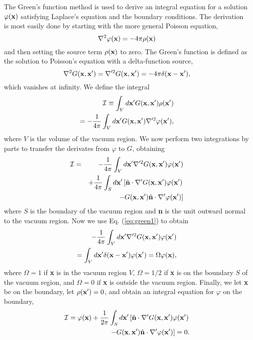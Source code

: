 \documentclass[prb,twocolumn,showpacs,preprintnumbers,amsmath,amssymb]{revtex4}
\renewcommand*{\v}[1]{\hbox{\bfseries #1}}
\begin{document}
The Green's function method is used to derive an integral equation for a
solution $\varphi(\v{x})$ satisfying Laplace's equation and the boundary
conditions.  The derivation is most easily done by starting with the
more general Poisson equation,
\[
\nabla^2 \varphi(\v{x}) = -4 \pi \rho(\v{x})
\]
and then setting the source term $\rho(\v{x})$ to zero.  The Green's
function is defined as the solution to Poisson's equation with a
delta-function source,
\begin{equation}
\nabla^2 G(\v{x},\v{x}') 
	= \nabla'^2 G(\v{x},\v{x}') 
	= -4 \pi \delta(\v{x} - \v{x}'),
\label{eq:green1}
\end{equation}
which vanishes at infinity.  We define the integral
\begin{eqnarray}
{\cal I} \equiv \int_V d\v{x}' G(\v{x},\v{x}') \rho(\v{x}') \nonumber \\
= - \frac{1}{4 \pi} \int_V d\v{x}' G(\v{x},\v{x}') 
	\nabla'^2 \varphi(\v{x}'),
\end{eqnarray}
where $V$ is the volume of the vacuum region.  We now perform
two integrations by parts to transfer the derivates from $\varphi$ to
$G$, obtaining
\begin{eqnarray}
{\cal I} =&& - \frac{1}{4 \pi} \int_V d\v{x}' \nabla'^2 G(\v{x},\v{x}')
	\varphi(\v{x}') \nonumber \\
&&+ \frac{1}{4 \pi} \int_S d\v{x}' \left[ 
	\hat{\bf n} \cdot \nabla' G(\v{x},\v{x}') \varphi(\v{x}')
	\right. \nonumber \\
&&\left. - G(\v{x},\v{x}') \hat{\bf n} \cdot \nabla' \varphi(\v{x}') 
	\right]
\end{eqnarray}
where $S$ is the boundary of the vacuum region and \v{n} is the unit
outward normal to the vacuum region.  Now we use Eq. (\ref{eq:green1})
to obtain
\begin{eqnarray}
- \frac{1}{4 \pi} \int_V d\v{x}' \nabla'^2 G(\v{x},\v{x}')
	\varphi(\v{x}') \nonumber \\
= \int_V d\v{x}' \delta(\v{x}-\v{x}') \varphi(\v{x}')
= \Omega \varphi(\v{x}),
\end{eqnarray}	
where $\Omega = 1$ if \v{x} is in the vacuum region $V$, $\Omega = 1/2$
if \v{x} is on the boundary $S$ of the vacuum region, and $\Omega = 0$
if \v{x} is outside the vacuum region.  Finally, we let \v{x} be on the
boundary, let $\rho(\v{x}') = 0$, and obtain an integral equation for
$\varphi$ on the boundary,
\begin{eqnarray}
{\cal I} = \varphi(\v{x}) + \frac{1}{2 \pi} \int_S d\v{x}' \left[
	\hat{\bf n} \cdot \nabla' G(\v{x},\v{x}') \varphi(\v{x}') 
	\right. \nonumber \\
\left. - G(\v{x},\v{x}') \hat{\bf n} \cdot \nabla' \varphi(\v{x}') 
\right] = 0.
\label{eq:green2}
\end{eqnarray}
\end{document}
